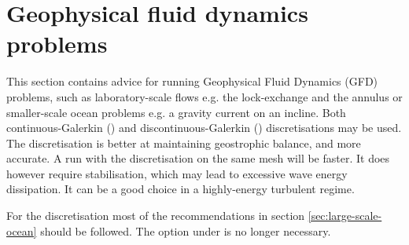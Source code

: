 
\section{Geophysical fluid dynamics problems}
\label{sec:gfd_problems}

This section contains advice for running Geophysical Fluid Dynamics (GFD) problems, such as laboratory-scale flows e.g. the lock-exchange and the annulus or smaller-scale ocean problems e.g. a gravity current on an incline.
  Both continuous-Galerkin (\Poo) and discontinuous-Galerkin (\PoDGPt)
discretisations may be used. The \PoDGPt discretisation is better at
maintaining geostrophic balance, and more accurate. A run with the \Poo
discretisation on the same mesh will be faster. It does however require
stabilisation, which may lead to excessive wave energy dissipation. It can be a
good choice in a highly-energy turbulent regime.

For the \PoDGPt discretisation most of the recommendations in section
\ref{sec:large-scale-ocean} should be followed. The option
 under  is no longer
necessary.

